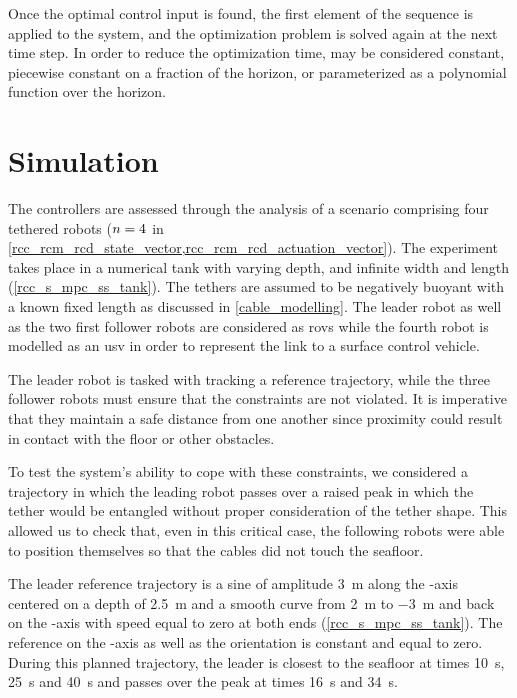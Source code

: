 Once the optimal control input is found, the first element of the sequence is applied to the
system, and the optimization problem is solved again at the next time step. In order to reduce the
optimization time,  may be considered constant, piecewise constant on a fraction of the
horizon, or parameterized as a polynomial function over the horizon.

\section{Simulation}
\label{rcc_simulation}

The controllers are assessed through the analysis of a scenario comprising four tethered robots
($n=4$ in \cref{rcc_rcm_rcd_state_vector,rcc_rcm_rcd_actuation_vector}). The experiment
takes place in a numerical tank with varying depth, and infinite width and length
(\cref{rcc_s_mpc_ss_tank}). The tethers are assumed to be negatively buoyant with a known fixed
length as discussed in \cref{cable_modelling}. The leader robot as well as the two first follower
robots are considered as \acp{rov} while the fourth robot is modelled as an \ac{usv} in order to
represent the link to a surface control vehicle.

The leader robot is tasked with tracking a reference trajectory, while the three follower robots
must ensure that the constraints are not violated. It is imperative that they maintain a safe
distance from one another since proximity could result in contact with the floor or other
obstacles.

To test the system's ability to cope with these constraints, we considered a trajectory in which
the leading robot passes over a raised peak in which the tether would be entangled without proper
consideration of the tether shape. This allowed us to check that, even in this critical case, the
following robots were able to position themselves so that the cables did not touch the seafloor.

The leader reference trajectory is a sine of amplitude \qty{3}{\m} along the -axis
centered on a depth of \qty{2.5}{\m} and a smooth curve from \qty{2}{\m} to \qty{-3}{\m} and back
on the -axis with speed equal to zero at both ends (\cref{rcc_s_mpc_ss_tank}). The
reference on the -axis as well as the orientation is constant and equal to zero.
During this planned trajectory, the leader is closest to the seafloor at times \qty{10}{\s},
\qty{25}{\s} and \qty{40}{\s} and passes over the peak at times \qty{16}{\s} and \qty{34}{\s}.

